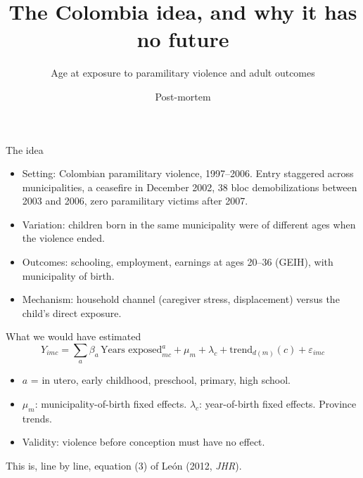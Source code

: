 \documentclass[aspectratio=169,11pt]{beamer}
\title{The Colombia idea, and why it has no future}
\subtitle{Age at exposure to paramilitary violence and adult outcomes}
\author{Post-mortem}
\date{\muted{October 2026}}
\newcommand{\acc}[1]{{\color{accent}#1}}
\newcommand{\lead}[1]{\vspace{0.3em}{\large #1}\vspace{0.8em}}
\begin{document}
\begin{frame}[plain]\titlepage\end{frame}

\begin{frame}{The idea}
\lead{Does the effect of violence on adult human capital depend on the age at which the child is exposed?}
\begin{itemize}
\item Setting: Colombian paramilitary violence, 1997--2006. Entry staggered across municipalities, a ceasefire in December 2002, 38 bloc demobilizations between 2003 and 2006, zero paramilitary victims after 2007.
\item Variation: children born in the same municipality were of different ages when the violence ended.
\item Outcomes: schooling, employment, earnings at ages 20--36 (GEIH), with municipality of birth.
\item Mechanism: household channel (caregiver stress, displacement) versus the child's direct exposure.
\end{itemize}
\end{frame}

\begin{frame}{What we would have estimated}
\begin{equation*}
Y_{imc} = \sum_{a} \beta_a\, \text{Years exposed}^{a}_{mc} + \mu_m + \lambda_{c} + \text{trend}_{d(m)}(c) + \varepsilon_{imc}
\end{equation*}
\vspace{0.3em}
\begin{itemize}
\item $a$ = in utero, early childhood, preschool, primary, high school.
\item $\mu_m$: municipality-of-birth fixed effects. $\lambda_c$: year-of-birth fixed effects. Province trends.
\item Validity: violence before conception must have no effect.
\end{itemize}
\vspace{1em}
\acc{This is, line by line, equation (3) of León (2012, \emph{JHR}).}
\end{frame}
\end{document}
